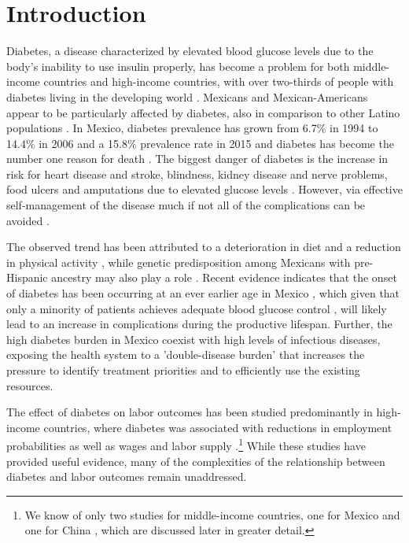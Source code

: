 \documentclass[12pt,english]{article}
\begin{document}
\section{\label{sec:Introduction4}Introduction }

Diabetes, a disease characterized by elevated blood glucose levels due to the body's inability to use insulin properly, has become a problem for both middle-income countries and high-income countries, with over two-thirds of people with diabetes living in the developing world \parencite{InternationalDiabetesFederation2015}. Mexicans and Mexican-Americans appear to be particularly affected by diabetes, also in comparison to other Latino populations \parencite{Schneiderman2014}. In Mexico, diabetes prevalence has grown from 6.7\% in 1994 to 14.4\% in 2006 \parencite{Barquera2013} and a 15.8\% prevalence rate in 2015 and diabetes has become the number one reason for death \parencite{InternationalDiabetesFederation2015}. The biggest danger of diabetes is the increase in risk for heart disease and stroke, blindness, kidney disease and nerve problems, food ulcers and amputations due to elevated glucose levels \parencite{Reynoso-Noveron2011}. However, via effective self-management of the disease much if not all of the complications can be avoided \parencite{Lim2011, Gregg2012}.

The observed trend has been attributed to a deterioration in diet and a reduction in physical activity \parencite{Barquera2008b,Basu2013}, while genetic predisposition among Mexicans with pre-Hispanic ancestry may also play a role \parencite{Williams2013}. Recent evidence indicates that the onset of diabetes has been occurring at an ever earlier age in Mexico \parencite{Bello-Chavolla2017a}, which given that only a minority of patients achieves adequate blood glucose control \parencite{Barquera2013}, will likely lead to an increase in complications during the productive lifespan. Further, the high diabetes burden in Mexico coexist with high levels of infectious diseases, exposing the health system to a 'double-disease burden' that increases the pressure to identify treatment priorities and to efficiently use the existing resources.

The effect of diabetes on labor outcomes has been studied predominantly in high-income countries, where diabetes was associated with reductions in employment probabilities as well as wages and labor supply \parencite{Brown2005,Brown2014,BrownIII2011,Minor2011,Minor2013,Minor2015,Latif2009,Seuring2015a}.\footnote{We know of only two studies for middle-income countries, one for Mexico \parencite{Seuring2015} and one for China \parencite{Liu2014}, which are discussed later in greater detail.} While these studies have provided useful evidence, many of the complexities of the relationship between diabetes and labor outcomes remain unaddressed. 
\end{document}
